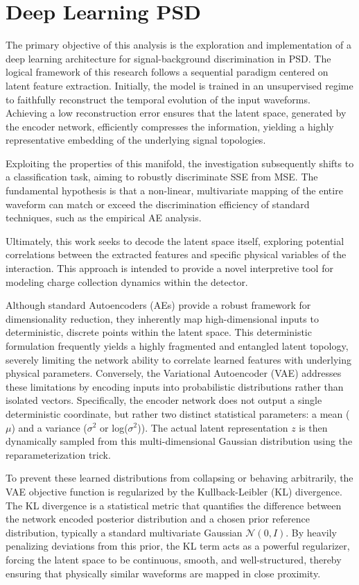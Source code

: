 \chapter{Deep Learning \ac{PSD}}
The primary objective of this analysis is the exploration and implementation of a deep learning architecture for signal-background discrimination in \ac{PSD}. The logical framework of this research follows a sequential paradigm centered on latent feature extraction. Initially, the model is trained in an unsupervised regime to faithfully reconstruct the temporal evolution of the input waveforms. Achieving a low reconstruction error ensures that the latent space, generated by the encoder network, efficiently compresses the information, yielding a highly representative embedding of the underlying signal topologies. 

Exploiting the properties of this manifold, the investigation subsequently shifts to a classification task, aiming to robustly discriminate \ac{SSE} from \ac{MSE}. The fundamental hypothesis is that a non-linear, multivariate mapping of the entire waveform can match or exceed the discrimination efficiency of standard techniques, such as the empirical \ac{AE} analysis. 

Ultimately, this work seeks to decode the latent space itself, exploring potential correlations between the extracted features and specific physical variables of the interaction. This approach is intended to provide a novel interpretive tool for modeling charge collection dynamics within the detector.

Although standard Autoencoders (AEs) provide a robust framework for dimensionality reduction, they inherently map high-dimensional inputs to deterministic, discrete points within the latent space. This deterministic formulation frequently yields a highly fragmented and entangled latent topology, severely limiting the network ability to correlate learned features with underlying physical parameters. Conversely, the Variational Autoencoder (VAE) addresses these limitations by encoding inputs into probabilistic distributions rather than isolated vectors. Specifically, the encoder network does not output a single deterministic coordinate, but rather two distinct statistical parameters: a mean ($\mu$) and a variance ($\sigma^2$ or log($\sigma^2$)). The actual latent representation $z$ is then dynamically sampled from this multi-dimensional Gaussian distribution using the reparameterization trick. 

To prevent these learned distributions from collapsing or behaving arbitrarily, the VAE objective function is regularized by the Kullback-Leibler (KL) divergence. The KL divergence is a statistical metric that quantifies the difference between the network encoded posterior distribution and a chosen prior reference distribution, typically a standard multivariate Gaussian $\mathcal{N}(0, I)$. By heavily penalizing deviations from this prior, the KL term acts as a powerful regularizer, forcing the latent space to be continuous, smooth, and well-structured, thereby ensuring that physically similar waveforms are mapped in close proximity.

